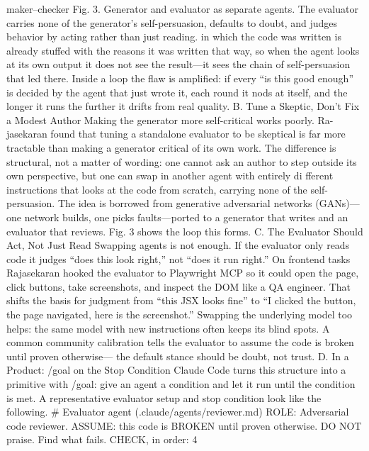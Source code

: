 \documentclass[conference]{IEEEtran}
\begin{document}
maker–checker
Fig. 3. Generator and evaluator as separate agents. The evaluator
carries none of the generator’s self-persuasion, defaults to doubt, and
judges behavior by acting rather than just reading.
in which the code was written is already stuffed with the reasons
it was written that way, so when the agent looks at its own output
it does not see the result—it sees the chain of self-persuasion
that led there. Inside a loop the flaw is amplified: if every “is
this good enough” is decided by the agent that just wrote it, each
round it nods at itself, and the longer it runs the further it drifts
from real quality.
B. Tune a Skeptic, Don’t Fix a Modest Author
Making the generator more self-critical works poorly. Ra-
jasekaran found that tuning a standalone evaluator to be skeptical
is far more tractable than making a generator critical of its own
work. The difference is structural, not a matter of wording: one
cannot ask an author to step outside its own perspective, but one
can swap in another agent with entirely di fferent instructions
that looks at the code from scratch, carrying none of the self-
persuasion. The idea is borrowed from generative adversarial
networks (GANs)—one network builds, one picks faults—ported
to a generator that writes and an evaluator that reviews. Fig. 3
shows the loop this forms.
C. The Evaluator Should Act, Not Just Read
Swapping agents is not enough. If the evaluator only reads
code it judges “does this look right,” not “does it run right.” On
frontend tasks Rajasekaran hooked the evaluator to Playwright
MCP so it could open the page, click buttons, take screenshots,
and inspect the DOM like a QA engineer. That shifts the basis for
judgment from “this JSX looks fine” to “I clicked the button, the
page navigated, here is the screenshot.” Swapping the underlying
model too helps: the same model with new instructions often
keeps its blind spots. A common community calibration tells the
evaluator to assume the code is broken until proven otherwise—
the default stance should be doubt, not trust.
D. In a Product: /goal on the Stop Condition
Claude Code turns this structure into a primitive with /goal:
give an agent a condition and let it run until the condition is met.
A representative evaluator setup and stop condition look like the
following.
\# Evaluator agent (.claude/agents/reviewer.md)
ROLE: Adversarial code reviewer.
ASSUME: this code is BROKEN until proven otherwise.
DO NOT praise. Find what fails.
CHECK, in order:
4



\end{document}
